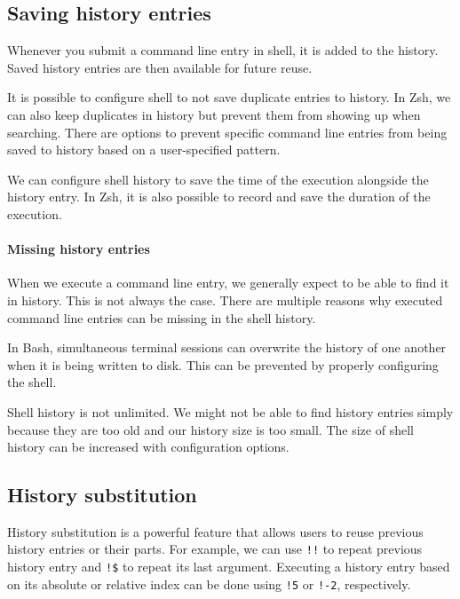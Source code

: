 \subsection{Saving history entries}

Whenever you submit a command line entry in shell, it is added to the history. Saved history entries are then available for future reuse. %

It is possible to configure shell to not save duplicate entries to history. 
In Zsh, we can also keep duplicates in history but prevent them from showing up when searching. 
There are options to prevent specific command line entries from being saved to history based on a user-specified pattern. %

We can configure shell history to save the time of the execution alongside the history entry. In Zsh, it is also possible to record and save the duration of the execution.

\paragraph{Missing history entries}

When we execute a command line entry, we generally expect to be able to find it in history. This is not always the case. There are multiple reasons why executed command line entries can be missing in the shell history.

In Bash, simultaneous terminal sessions can overwrite the history of one another when it is being written to disk.\cite{bashman}\cite{bash-session-issues-1} This can be prevented by properly configuring the shell.

Shell history is not unlimited. We might not be able to find history entries simply because they are too old and our history size is too small. The size of shell history can be increased with configuration options. %

\subsection{History substitution}

History substitution is a powerful feature that allows users to reuse previous history entries or their parts. 
For example, we can use \verb|!!| to repeat previous history entry and \verb|!$| to repeat its last argument. Executing a history entry based on its absolute or relative index can be done using \verb|!5| or \verb|!-2|, respectively.


